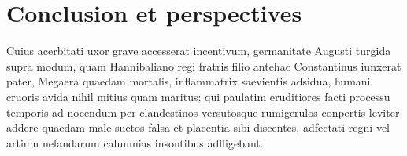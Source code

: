 \chapter{Conclusion et perspectives}

Cuius acerbitati uxor grave accesserat incentivum, germanitate Augusti
turgida supra modum, quam Hannibaliano regi fratris filio antehac
Constantinus iunxerat pater, Megaera quaedam mortalis, inflammatrix
saevientis adsidua, humani cruoris avida nihil mitius quam maritus;
qui paulatim eruditiores facti processu temporis ad nocendum per
clandestinos versutosque rumigerulos conpertis leviter addere quaedam
male suetos falsa et placentia sibi discentes, adfectati regni vel
artium nefandarum calumnias insontibus adfligebant.


